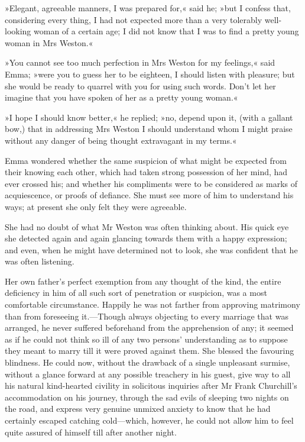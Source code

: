 »Elegant, agreeable manners, I was prepared for,« said he; »but I confess that, considering every thing, I had not expected more than a very tolerably well-looking woman of a certain age; I did not know that I was to find a pretty young woman in Mrs Weston.«

»You cannot see too much perfection in Mrs Weston for my feelings,« said Emma; »were you to guess her to be eighteen, I should listen with pleasure; but she would be ready to quarrel with you for using such words. Don't let her imagine that you have spoken of her as a pretty young woman.«

»I hope I should know better,« he replied; »no, depend upon it, (with a gallant bow,) that in addressing Mrs Weston I should understand whom I might praise without any danger of being thought extravagant in my terms.«

Emma wondered whether the same suspicion of what might be expected from their knowing each other, which had taken strong possession of her mind, had ever crossed his; and whether his compliments were to be considered as marks of acquiescence, or proofs of defiance. She must see more of him to understand his ways; at present she only felt they were agreeable.

She had no doubt of what Mr Weston was often thinking about. His quick eye she detected again and again glancing towards them with a happy expression; and even, when he might have determined not to look, she was confident that he was often listening.

Her own father's perfect exemption from any thought of the kind, the entire deficiency in him of all such sort of penetration or suspicion, was a most comfortable circumstance. Happily he was not farther from approving matrimony than from foreseeing it.—Though always objecting to every marriage that was arranged, he never suffered beforehand from the apprehension of any; it seemed as if he could not think so ill of any two persons' understanding as to suppose they meant to marry till it were proved against them. She blessed the favouring blindness. He could now, without the drawback of a single unpleasant surmise, without a glance forward at any possible treachery in his guest, give way to all his natural kind-hearted civility in solicitous inquiries after Mr Frank Churchill's accommodation on his journey, through the sad evils of sleeping two nights on the road, and express very genuine unmixed anxiety to know that he had certainly escaped catching cold—which, however, he could not allow him to feel quite assured of himself till after another night.

